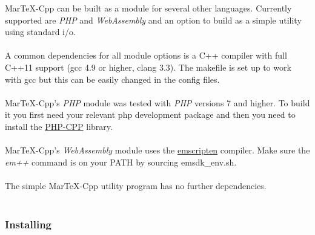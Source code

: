\begin{page}
MarTeX-Cpp can be built as a module for several other languages. Currently supported are \textit{PHP} and \textit{WebAssembly} and an option to build as a simple utility using standard i/o.
\\ \\
A common dependencies for all module options is a C++ compiler with full C++11 support (gcc 4.9 or higher, clang 3.3). The makefile is set up to work with gcc but this can be easily changed in the config files.
\\ \\ 
MarTeX-Cpp's \textit{PHP} module was tested with \textit{PHP} versions 7 and higher. To build it you first need your relevant php development package and then you need to install the \href{http://www.php-cpp.com/}{PHP-CPP} library. 
\\ \\
MarTeX-Cpp's \textit{WebAssembly} module uses the \href{https://kripken.github.io/emscripten-site/}{emscripten} compiler. Make sure the \textit{em++} command is on your PATH by sourcing emsdk_env.sh.
\\ \\
The simple MarTeX-Cpp utility program has no further dependencies.
\\ \\
\subsubsection{Installing}


\end{page}
